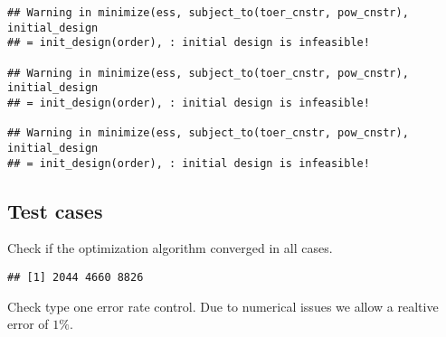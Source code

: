 \documentclass[]{book}
\newenvironment{Shaded}{\begin{snugshade}}{\end{snugshade}}
\newcommand{\ControlFlowTok}[1]{\textcolor[rgb]{0.13,0.29,0.53}{\textbf{#1}}}
\newcommand{\KeywordTok}[1]{\textcolor[rgb]{0.13,0.29,0.53}{\textbf{#1}}}
\newcommand{\NormalTok}[1]{#1}
\newcommand{\OperatorTok}[1]{\textcolor[rgb]{0.81,0.36,0.00}{\textbf{#1}}}
\newcommand{\StringTok}[1]{\textcolor[rgb]{0.31,0.60,0.02}{#1}}
\begin{document}
\begin{verbatim}
## Warning in minimize(ess, subject_to(toer_cnstr, pow_cnstr), initial_design
## = init_design(order), : initial design is infeasible!

## Warning in minimize(ess, subject_to(toer_cnstr, pow_cnstr), initial_design
## = init_design(order), : initial design is infeasible!

## Warning in minimize(ess, subject_to(toer_cnstr, pow_cnstr), initial_design
## = init_design(order), : initial design is infeasible!
\end{verbatim}

\hypertarget{test-cases-10}{%
\subsection{Test cases}\label{test-cases-10}}

Check if the optimization algorithm converged in all cases.

\begin{Shaded}
\end{Shaded}

\begin{verbatim}
## [1] 2044 4660 8826
\end{verbatim}

\begin{Shaded}
\end{Shaded}

Check type one error rate control.
Due to numerical issues we allow a realtive error of \(1\%\).
\end{document}
